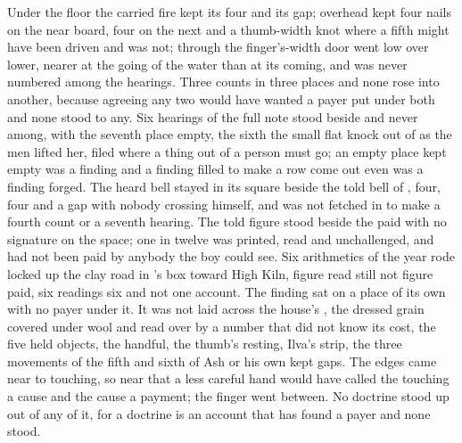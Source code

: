 Under the floor the carried fire kept its four and its gap; overhead  kept four nails on the near board, four on the next and a thumb-width knot where a fifth might have been driven and was not; through the finger's-width door  went low over lower, nearer at the going of the water than at its coming, and was never numbered among the hearings. Three counts in three places and none rose into another, because agreeing any two would have wanted a payer put under both and none stood to any. Six hearings of the full note stood beside and never among, with the seventh place empty, the sixth the small flat knock out of  as the men lifted her, filed where a thing out of a person must go; an empty place kept empty was a finding and a finding filled to make a row come out even was a finding forged. The heard bell stayed in its square beside the told bell of , four, four and a gap with nobody crossing himself, and was not fetched in to make a fourth count or a seventh hearing. The told figure stood beside the paid with no signature on the space; one in twelve was printed, read and unchallenged, and had not been paid by anybody the boy could see. Six arithmetics of the year rode locked up the clay road in 's box toward High Kiln, figure read still not figure paid, six readings six and not one account. The finding sat on a place of its own with no payer under it. It was not laid across the house's , the dressed grain covered under wool and read over by a number that did not know its cost, the five held objects, the handful, the thumb's resting, Ilva's strip, the three movements of the fifth and sixth of Ash or his own kept gaps. The edges came near to touching, so near that a less careful hand would have called the touching a cause and the cause a payment; the finger went between. No doctrine stood up out of any of it, for a doctrine is an account that has found a payer and none stood.

